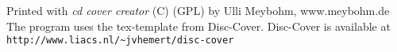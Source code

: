 \documentclass[]{article}
\begin{document}
\noindent
\parbox{11cm}
{
{\small Printed with \emph{cd cover creator} (C) (GPL) by Ulli Meybohm, www.meybohm.de
The program uses the tex-template from Disc-Cover.
Disc-Cover is available at  \texttt{http://www.liacs.nl/\~{}jvhemert/disc-cover}}
}
\vspace{0.5cm}
\end{document}
